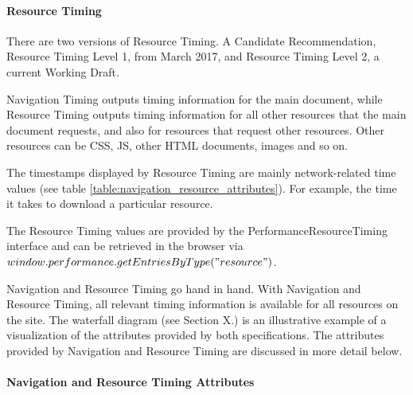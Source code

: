 
\paragraph{Resource Timing} %


There are two versions of Resource Timing.
A Candidate Recommendation, Resource Timing Level 1, from March 2017, %
and Resource Timing Level 2, a current Working Draft. %

Navigation Timing outputs timing information for the main document, while Resource Timing outputs timing information for all other resources that the main document requests, and also for resources that request other resources.
Other resources can be CSS, JS, other HTML documents, images and so on.

The timestamps displayed by Resource Timing are mainly network-related time values (see table \ref{table:navigation_resource_attributes}).
For example, the time it takes to download a particular resource.


The Resource Timing values are provided by the PerformanceResourceTiming interface and can be retrieved in the browser via $window.performance.getEntriesByType("resource")$.



Navigation and Resource Timing go hand in hand.
With Navigation and Resource Timing, all relevant timing information is available for all resources on the site.
The waterfall diagram (see Section X.) is an illustrative example of a visualization of the attributes provided by both specifications.
The attributes provided by Navigation and Resource Timing are discussed in more detail below.



\paragraph{Navigation and Resource Timing Attributes} %

